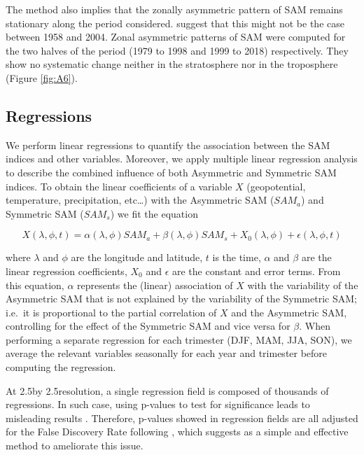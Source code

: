 \documentclass[smallextended]{svjour3}       %
\begin{document}
The method also implies that the zonally asymmetric pattern of SAM remains stationary along the period considered. \citet{silvestri2009} suggest that this might not be the case between 1958 and 2004. Zonal asymmetric patterns of SAM were computed for the two halves of the period (1979 to 1998 and 1999 to 2018) respectively. They show no systematic change neither in the stratosphere nor in the troposphere (Figure \ref{fig:A6}).

\hypertarget{regressions}{%
\subsection{Regressions}\label{regressions}}

We perform linear regressions to quantify the association between the SAM indices and other variables. Moreover, we apply multiple linear regression analysis to describe the combined influence of both Asymmetric and Symmetric SAM indices. To obtain the linear coefficients of a variable \(X\) (geopotential, temperature, precipitation, etc\ldots{}) with the Asymmetric SAM (\(SAM_a\)) and Symmetric SAM (\(SAM_s\)) we fit the equation

\[
X(\lambda, \phi, t) = \alpha(\lambda, \phi) SAM_a + \beta(\lambda, \phi) SAM_s + X_0(\lambda, \phi) +  \epsilon(\lambda, \phi, t)
\]

where \(\lambda\) and \(\phi\) are the longitude and latitude, \(t\) is the time, \(\alpha\) and \(\beta\) are the linear regression coefficients, \(X_0\) and \(\epsilon\) are the constant and error terms. From this equation, \(\alpha\) represents the (linear) association of \(X\) with the variability of the Asymmetric SAM that is not explained by the variability of the Symmetric SAM; i.e.~it is proportional to the partial correlation of \(X\) and the Asymmetric SAM, controlling for the effect of the Symmetric SAM and vice versa for \(\beta\). When performing a separate regression for each trimester (DJF, MAM, JJA, SON), we average the relevant variables seasonally for each year and trimester before computing the regression.

At 2.5\degree by 2.5\degree resolution, a single regression field is composed of thousands of regressions. In such case, using p-values to test for significance leads to misleading results \citep{walker1914, katz1991}. Therefore, p-values showed in regression fields are all adjusted for the False Discovery Rate following \citet{benjamini1995}, which \citet{wilks2016} suggests as a simple and effective method to ameliorate this issue.
\end{document}
